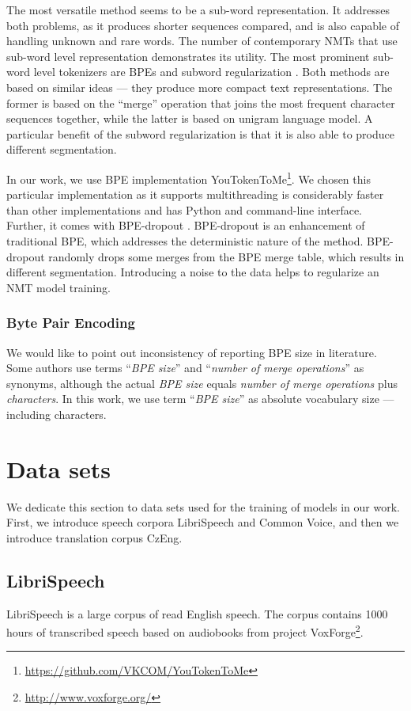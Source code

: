 The most versatile method seems to be a sub-word representation. It addresses both problems, as it produces shorter sequences compared, and is also capable of handling unknown and rare words. The number of contemporary NMTs that use sub-word level representation demonstrates its utility. The most prominent sub-word level tokenizers are BPEs  and subword regularization . Both methods are based on similar ideas --- they produce more compact text representations. The former is based on the ``merge'' operation that joins the most frequent character sequences together, while the latter is based on unigram language model. A particular benefit of the subword regularization is that it is also able to produce different segmentation.

In our work, we use BPE implementation YouTokenToMe\footnote{\url{https://github.com/VKCOM/YouTokenToMe}}. We chosen this particular implementation as it supports multithreading is considerably faster than other implementations and has Python and command-line interface. Further, it comes with BPE-dropout . BPE-dropout is an enhancement of traditional BPE, which addresses the deterministic nature of the method. BPE-dropout randomly drops some merges from the BPE merge table, which results in different segmentation. Introducing a noise to the data helps to regularize an NMT model training.

\subsubsection{Byte Pair Encoding}
We would like to point out inconsistency of reporting BPE size in literature. Some authors use terms ``\textit{BPE size}'' and ``\textit{number of merge operations}'' as synonyms, although the actual \textit{BPE size} equals \textit{number of merge operations} plus \textit{characters}. In this work, we use term ``\textit{BPE size}'' as absolute vocabulary size --- including characters. 

\pagebreak
\section{Data sets}
We dedicate this section to data sets used for the training of models in our work. First, we introduce speech corpora LibriSpeech and Common Voice, and then we introduce translation corpus CzEng.

\subsection{LibriSpeech}
LibriSpeech  is a large corpus of read English speech. The corpus contains 1000 hours of transcribed speech based on audiobooks from project VoxForge\footnote{\url{http://www.voxforge.org/}}.

